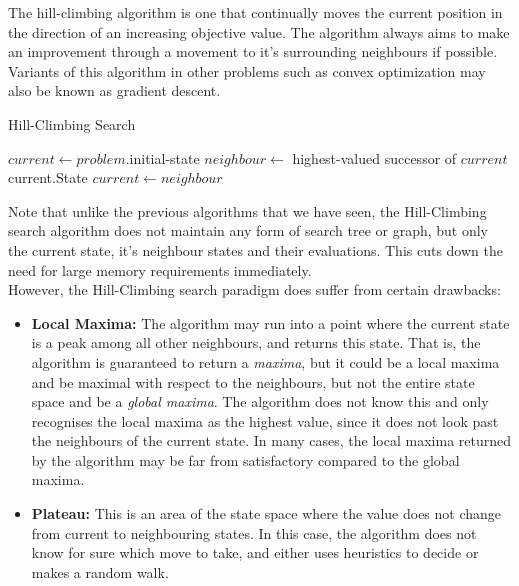 \documentclass[12pt]{article}
\begin{document}
The hill-climbing algorithm is one that continually moves the current position in the direction of an increasing objective value. The algorithm always aims to make an improvement through a movement to it's surrounding neighbours if possible. Variants of this algorithm in other problems such as convex optimization may also be known as  gradient descent.\\

\begin{algorithm}
\caption{Hill-Climbing Search}\label{euclid}
\begin{algorithmic}[1]
\State $current \leftarrow problem.$initial-state
\Loop
	\State $neighbour \leftarrow$ highest-valued successor of $current$
		\State \Return current.State
	\Else 
		\State $current \leftarrow neighbour$
	\EndIf
\EndLoop
\end{algorithmic}
\end{algorithm}

Note that unlike the previous algorithms that we have seen, the Hill-Climbing search algorithm does not maintain any form of search tree or graph, but only the current state, it's neighbour states and their evaluations. This cuts down the need for large memory requirements immediately.\\

However, the Hill-Climbing search paradigm does suffer from certain drawbacks:

\begin{itemize}
\item \textbf{Local Maxima:} The algorithm may run into a point where the current state is a peak among all other neighbours, and returns this state. That is, the algorithm is guaranteed to return a \textit{maxima}, but it could be a local maxima and be maximal with respect to the neighbours, but not the entire state space and be a \textit{global maxima}. The algorithm does not know this and only recognises the local maxima as the highest value, since it does not look past the neighbours of the current state. In many cases, the local maxima returned by the algorithm may be far from satisfactory compared to the global maxima.

\item \textbf{Plateau:} This is an area of the state space where the value does not change from current to neighbouring states. In this case, the algorithm does not know for sure which move to take, and either uses heuristics to decide or makes a random walk.
\end{itemize}
\end{document}
